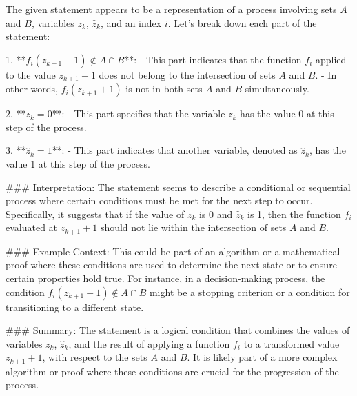 The given statement appears to be a representation of a process involving sets \(A\) and \(B\), variables \(z_k\), \(\hat{z}_k\), and an index \(i\). Let's break down each part of the statement:

1. **\(f_i(z_{k+1} + 1) \notin A \cap B\)**:
   - This part indicates that the function \(f_i\) applied to the value \(z_{k+1} + 1\) does not belong to the intersection of sets \(A\) and \(B\).
   - In other words, \(f_i(z_{k+1} + 1)\) is not in both sets \(A\) and \(B\) simultaneously.

2. **\(z_k = 0\)**:
   - This part specifies that the variable \(z_k\) has the value 0 at this step of the process.

3. **\(\hat{z}_k = 1\)**:
   - This part indicates that another variable, denoted as \(\hat{z}_k\), has the value 1 at this step of the process.

### Interpretation:
The statement seems to describe a conditional or sequential process where certain conditions must be met for the next step to occur. Specifically, it suggests that if the value of \(z_k\) is 0 and \(\hat{z}_k\) is 1, then the function \(f_i\) evaluated at \(z_{k+1} + 1\) should not lie within the intersection of sets \(A\) and \(B\).

### Example Context:
This could be part of an algorithm or a mathematical proof where these conditions are used to determine the next state or to ensure certain properties hold true. For instance, in a decision-making process, the condition \(f_i(z_{k+1} + 1) \notin A \cap B\) might be a stopping criterion or a condition for transitioning to a different state.

### Summary:
The statement is a logical condition that combines the values of variables \(z_k\), \(\hat{z}_k\), and the result of applying a function \(f_i\) to a transformed value \(z_{k+1} + 1\), with respect to the sets \(A\) and \(B\). It is likely part of a more complex algorithm or proof where these conditions are crucial for the progression of the process.